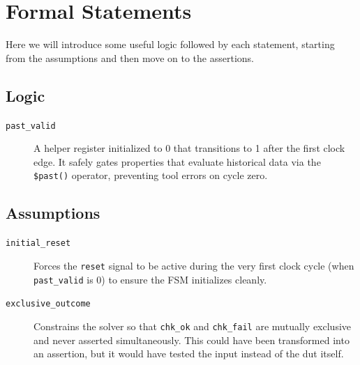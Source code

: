 \chapter{Formal Statements} 
\label{cha:formal_statements}

Here we will introduce some useful logic followed by each statement, starting from the assumptions and then move on to the assertions.

\section{Logic}
\begin{description}
    \item[\texttt{past\_valid}]
        A helper register initialized to 0 that transitions to 1 after the first clock edge.
        It safely gates properties that evaluate historical data via the \texttt{\$past()} operator, preventing tool errors on cycle zero.
\end{description}



\section{Assumptions}
\begin{description}
    \item[\texttt{initial\_reset}] 
        Forces the \texttt{reset} signal to be active during the very first clock cycle (when \texttt{past\_valid} is 0) to ensure the FSM initializes cleanly.
    
    \item[\texttt{exclusive\_outcome}]
        Constrains the solver so that \texttt{chk\_ok} and \texttt{chk\_fail} are mutually exclusive and never asserted simultaneously.
        This could have been transformed into an assertion, but it would have tested the input instead of the dut itself.
    
\end{description}

